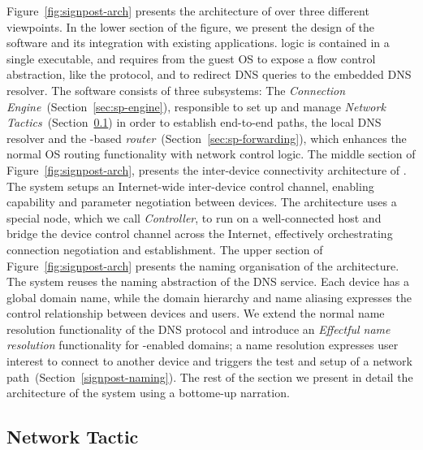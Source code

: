 Figure~\ref{fig:signpost-arch} presents the architecture of \signpost over three
different viewpoints.  In the lower section of the figure, we present the design
of the \signpost software and its integration with existing applications.
\signpost logic is contained in a single executable, and requires from the guest
OS to expose a flow control abstraction, like the \of protocol, and to redirect
DNS queries to the embedded DNS resolver.  The software consists of three
subsystems: The \textit{Connection Engine}~(Section~\ref{sec:sp-engine}),
responsible to set up and manage \textit{Network
  Tactics}~(Section~\ref{sec:sp-tactics}) in order to establish end-to-end paths,
the local DNS resolver and the \of-based \textit{\signpost
  router}~(Section~\ref{sec:sp-forwarding}), which enhances the normal OS routing
functionality with \signpost network control logic.  
The middle section of Figure~\ref{fig:signpost-arch}, presents the inter-device
connectivity architecture of \signpost. The system setups an Internet-wide
inter-device control channel, enabling capability and parameter negotiation
between devices. The architecture  uses a special \signpost node, which we call
\emph{\signpost Controller}, to run on a well-connected host and bridge the
device control channel across the Internet, effectively orchestrating connection
negotiation and establishment. 
%
The upper section of Figure~\ref{fig:signpost-arch} presents the naming
organisation of the \signpost architecture. The system reuses the naming
abstraction of the DNS service. Each device has a global domain name, while the
domain hierarchy and name aliasing expresses the control relationship between
devices and users.  We extend the normal name resolution functionality of the
DNS protocol and introduce an \textit{Effectful name resolution} functionality
for \signpost-enabled domains; a name resolution expresses user interest to
connect to another device and triggers the test and setup of a network
path~(Section~\ref{signpost-naming}).  The rest of the section we present in
detail the architecture of the \signpost system using a bottome-up narration. 

\subsection{Network Tactic} \label{sec:sp-tactics}

